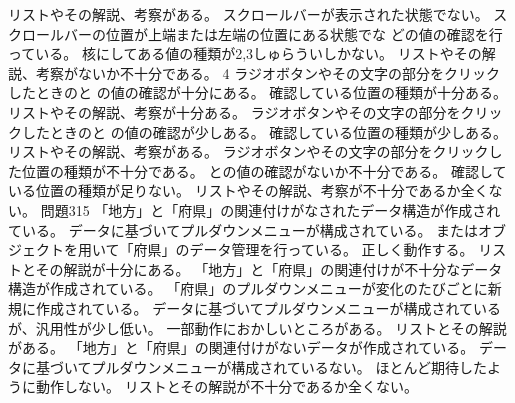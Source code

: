 {{ {リストやその解説、考察がある。}
 }
 {
 {スクロールバーが表示された状態でない。}
 {スクロールバーの位置が上端または左端の位置にある状態でな
 どの値の確認を行っている。}
 {核にしてある値の種類が2,3しゅらういしかない。}
 {リストやその解説、考察がないか不十分である。}
 }
 {}{4}
 {
 {ラジオボタンやその文字の部分をクリックしたときのと
 の値の確認が十分にある。}
 {確認している位置の種類が十分ある。}
 {リストやその解説、考察が十分ある。}
 }
 {
 {ラジオボタンやその文字の部分をクリックしたときのと
 の値の確認が少しある。}
 {確認している位置の種類が少しある。}
 {リストやその解説、考察がある。}
 }
 {
 {ラジオボタンやその文字の部分をクリックした位置の種類が不十分である。}
 {との値の確認がないか不十分である。}
 {確認している位置の種類が足りない。}
 {リストやその解説、考察が不十分であるか全くない。}
 }
 {問題3}{15}
 {
 {「地方」と「府県」の関連付けがなされたデータ構造が作成されている。}
 {データに基づいてプルダウンメニューが構成されている。}
 {またはオブジェクトを用いて「府県」のデータ管理を行っている。}
 {正しく動作する。}
 {リストとその解説が十分にある。}
 }
 {
 {「地方」と「府県」の関連付けが不十分なデータ構造が作成されている。}
 {「府県」のプルダウンメニューが変化のたびごとに新規に作成されている。}
 {データに基づいてプルダウンメニューが構成されているが、汎用性が少し低い。}
 {一部動作におかしいところがある。}
 {リストとその解説がある。}
 }
 {
 {「地方」と「府県」の関連付けがないデータが作成されている。}
 {データに基づいてプルダウンメニューが構成されているない。}
 {ほとんど期待したように動作しない。}
 {リストとその解説が不十分であるか全くない。}
 }
 }